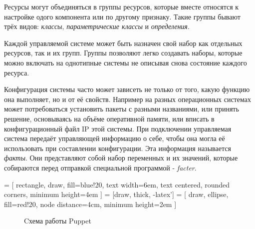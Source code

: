 Ресурсы могут объединяться в группы ресурсов, которые вместе относятся к настройке одого компонента или по другому признаку. Такие группы бывают трёх видов: \textit{классы}, \textit{параметрические классы} и \textit{определения}.

Каждой управляемой системе может быть назначен свой набор как отдельных ресурсов, так и их групп. Группы позволяют легко создавать наборы, которые можно включать на однотипные системы не описывая снова состояние каждого ресурса.

Конфигурация системы часто может зависеть не только от того, какую функцию она выполняет, но и от её свойств. Например на разных операционных системах может потребоваться установить пакеты с разными названиями, или принять решение, основываясь на объёме оперативной памяти, или вписать в конфигурационный файл IP этой системы. При подключении управляемая система передаёт управляющей информацию о себе, чтобы она могла её использовать при составлении конфигурации. Эта информация называется \textit{факты}. Они представляют собой набор переменных и их значений, которые собираются перед отправкой специальной программой - \textit{facter}.

 = [
rectangle, draw, fill=blue!20, text width=6em,
text centered, rounded corners, minimum height=4em
]
 = [draw, thick, -latex']
 = [
draw, ellipse, fill=red!20,
node distance=4cm, minimum height=2em
]

\begin{figure}[!h]
\centering
{}
\caption{Cхема работы Puppet}
\label{fig:puppet_scheme}
\end{figure}

